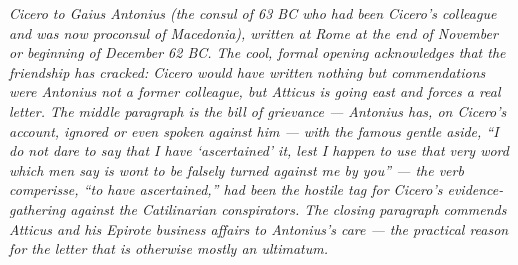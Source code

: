 
\textit{Cicero to Gaius Antonius (the consul of 63 BC who
had been Cicero's colleague and was now proconsul of
Macedonia), written at Rome at the end of November or
beginning of December 62 BC. The cool, formal opening
acknowledges that the friendship has cracked: Cicero would
have written nothing but commendations were Antonius not a
former colleague, but Atticus is going east and forces a
real letter. The middle paragraph is the bill of grievance
--- Antonius has, on Cicero's account, ignored or even
spoken against him --- with the famous gentle aside, ``I
do not dare to say that I have `ascertained' it, lest I
happen to use that very word which men say is wont to be
falsely turned against me by you'' --- the verb
\textit{comperisse}, ``to have ascertained,'' had been the
hostile tag for Cicero's evidence-gathering against the
Catilinarian conspirators. The closing paragraph commends
Atticus and his Epirote business affairs to Antonius's
care --- the practical reason for the letter that is
otherwise mostly an ultimatum.}
